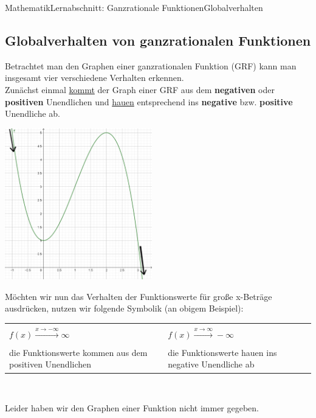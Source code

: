 \documentclass[11pt,twocolumn,oneside,openany,headings=optiontotoc,11pt,numbers=noenddot]{article}
\begin{document}
	\begin{worksheet}{Mathematik}{Lernabschnitt: Ganzrationale Funktionen}{Globalverhalten}
		\setcounter{section}{6}
		\setcounter{subsection}{2}
		\subsection{Globalverhalten von ganzrationalen Funktionen}
		Betrachtet man den Graphen einer ganzrationalen Funktion (GRF) kann man insgesamt vier verschiedene Verhalten erkennen.\\
		Zunächst einmal \underline{kommt} der Graph einer GRF aus dem \textbf{negativen} oder \textbf{positiven} Unendlichen und \underline{hauen} entsprechend ins \textbf{negative} bzw. \textbf{positive} Unendliche ab.\\
		\par\noindent
		\includegraphics[width=0.48\textwidth]{../99_Bilder/03-1_gVerh.png}\\
		\par\noindent
		Möchten wir nun das Verhalten der Funktionswerte für große x-Beträge ausdrücken, nutzen wir folgende Symbolik (an obigem Beispiel):\\
		\par\noindent
		\begin{tabularx}{0.48\textwidth}{X|X}
			\hline
			& \\
			\(f(x) \xrightarrow{x\rightarrow-\infty}\infty\) & \(f(x) \xrightarrow{x\rightarrow\infty}-\infty\)\\
			\\
			die Funktionswerte kommen aus dem positiven Unendlichen & die Funktionswerte hauen ins negative Unendliche ab\\
			\hline
		\end{tabularx}\\
		\par\noindent
		Leider haben wir den Graphen einer Funktion nicht immer gegeben.\\

\end{worksheet}
\end{document}
